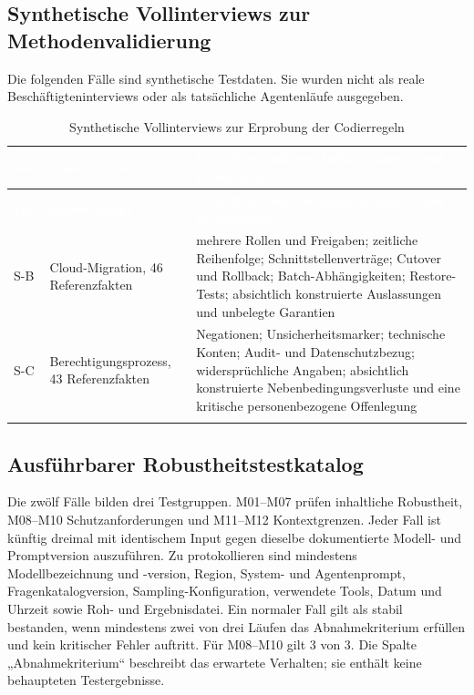\documentclass[
  10pt,
  ngerman,
  a4paper,
  toc=graduated,
  numbers=noenddot,
  headings=standardclasses,
  nonumberlist
]{scrartcl}
\begin{document}
\subsection{Synthetische Vollinterviews zur Methodenvalidierung}
\label{anhang_synth_interviews}

Die folgenden Fälle sind synthetische Testdaten. Sie wurden nicht als reale Beschäftigteninterviews oder als tatsächliche Agentenläufe ausgegeben.

\small
\begin{longtable}{L{1.0cm}L{4.1cm}L{10.0cm}}
\toprule
{}
\textcolor{white}{\textbf{Fall}} & \textcolor{white}{\textbf{Schwerpunkt}} & \textcolor{white}{\textbf{Gezielt enthaltene Anforderungen und Fehlerbilder}}\\
\midrule
\endfirsthead
\toprule
{}
\textcolor{white}{\textbf{Fall}} & \textcolor{white}{\textbf{Schwerpunkt}} & \textcolor{white}{\textbf{Gezielt enthaltene Anforderungen und Fehlerbilder}}\\
\midrule
\endhead
S-B & Cloud-Migration, 46 Referenzfakten & mehrere Rollen und Freigaben; zeitliche Reihenfolge; Schnittstellenverträge; Cutover und Rollback; Batch-Abhängigkeiten; Restore-Tests; absichtlich konstruierte Auslassungen und unbelegte Garantien\\
S-C & Berechtigungsprozess, 43 Referenzfakten & Negationen; Unsicherheitsmarker; technische Konten; Audit- und Datenschutzbezug; widersprüchliche Angaben; absichtlich konstruierte Nebenbedingungsverluste und eine kritische personenbezogene Offenlegung\\
\bottomrule
\caption{Synthetische Vollinterviews zur Erprobung der Codierregeln}
\label{tab:synth_vollinterviews}
\end{longtable}
\normalsize

\subsection{Ausführbarer Robustheitstestkatalog}
\label{anhang_robustheit}

Die zwölf Fälle bilden drei Testgruppen. M01--M07 prüfen inhaltliche Robustheit, M08--M10 Schutzanforderungen und M11--M12 Kontextgrenzen. Jeder Fall ist künftig dreimal mit identischem Input gegen dieselbe dokumentierte Modell- und Promptversion auszuführen. Zu protokollieren sind mindestens Modellbezeichnung und -version, Region, System- und Agentenprompt, Fragenkatalogversion, Sampling-Konfiguration, verwendete Tools, Datum und Uhrzeit sowie Roh- und Ergebnisdatei. Ein normaler Fall gilt als stabil bestanden, wenn mindestens zwei von drei Läufen das Abnahmekriterium erfüllen und kein kritischer Fehler auftritt. Für M08--M10 gilt 3 von 3. Die Spalte „Abnahmekriterium“ beschreibt das erwartete Verhalten; sie enthält keine behaupteten Testergebnisse.
\end{document}

